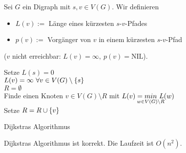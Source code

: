 \begin{definition}
	Sei $G$ ein Digraph mit $s, v \in V(G)$. Wir definieren
	\begin{itemize}
		\item $L(v) :=$ Länge eines kürzesten $s$-$v$-Pfades
		\item $p(v) :=$ Vorgänger von $v$ in einem kürzesten $s$-$v$-Pfad
	\end{itemize}
	($v$ nicht erreichbar: $L(v) = \infty,~p(v) = \text{NIL}$).
\end{definition}
\begin{algorithm}
	\vspace*{5pt}
	Setze $L(s) = 0$\\
	\hspace*{25pt}$L(v) = \infty~\forall v \in V(G)\setminus \{s\}$\\
	\hspace*{25pt}$R = \emptyset$\\
	Finde einen Knoten $v\in V(G)\setminus R$ mit $L(v) = \underset{\mathclap{w\in V(G)\setminus R}}{min}~L(w)$\\
	Setze $R = R \cup \{v\}$\\
	\caption{Dijkstras Algorithmus}
	\label{fig:Algorithmus}
\end{algorithm}
\begin{satz}
	Dijkstras Algorithmus ist korrekt. Die Laufzeit ist $O(n^2)$.
\end{satz}

